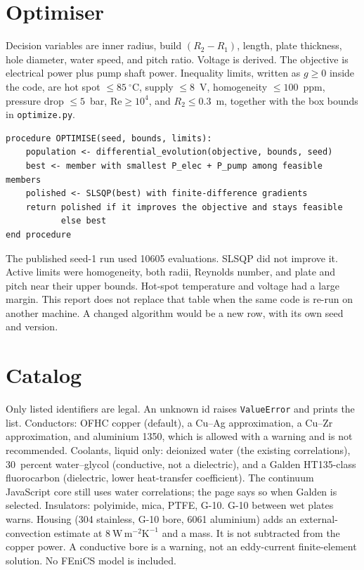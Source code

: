 \documentclass[11pt]{article}
\begin{document}
\section{Optimiser}

Decision variables are inner radius, build $(R_2-R_1)$, length, plate thickness, hole diameter, water speed, and pitch ratio.
Voltage is derived.
The objective is electrical power plus pump shaft power.
Inequality limits, written as $g\ge 0$ inside the code, are hot spot $\le 85~^\circ$C, supply $\le 8$~V, homogeneity $\le 100$~ppm, pressure drop $\le 5$~bar, $\mathrm{Re}\ge 10^4$, and $R_2\le 0.3$~m, together with the box bounds in \texttt{optimize.py}.

\begin{verbatim}
procedure OPTIMISE(seed, bounds, limits):
    population <- differential_evolution(objective, bounds, seed)
    best <- member with smallest P_elec + P_pump among feasible members
    polished <- SLSQP(best) with finite-difference gradients
    return polished if it improves the objective and stays feasible
           else best
end procedure
\end{verbatim}

The published seed-1 run used 10605 evaluations.
SLSQP did not improve it.
Active limits were homogeneity, both radii, Reynolds number, and plate and pitch near their upper bounds.
Hot-spot temperature and voltage had a large margin.
This report does not replace that table when the same code is re-run on another machine.
A changed algorithm would be a new row, with its own seed and version.

\section{Catalog}

Only listed identifiers are legal.
An unknown id raises \texttt{ValueError} and prints the list.
Conductors: OFHC copper (default), a Cu--Ag approximation, a Cu--Zr approximation, and aluminium 1350, which is allowed with a warning and is not recommended.
Coolants, liquid only: deionized water (the existing correlations), 30~percent water--glycol (conductive, not a dielectric), and a Galden HT135-class fluorocarbon (dielectric, lower heat-transfer coefficient).
The continuum JavaScript core still uses water correlations; the page says so when Galden is selected.
Insulators: polyimide, mica, PTFE, G-10.
G-10 between wet plates warns.
Housing (304 stainless, G-10 bore, 6061 aluminium) adds an external-convection estimate at $8~\mathrm{W\,m^{-2}K^{-1}}$ and a mass.
It is not subtracted from the copper power.
A conductive bore is a warning, not an eddy-current finite-element solution.
No FEniCS model is included.
\end{document}
